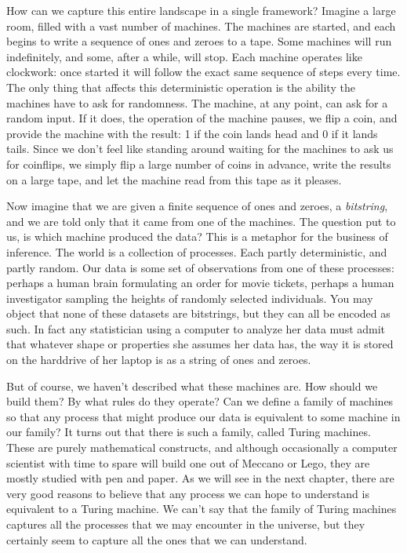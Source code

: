 How can we capture this entire landscape in a single framework? Imagine a large room, filled with a vast number of machines. The machines are started, and each begins to write a sequence of ones and zeroes to a tape. Some machines will run indefinitely, and some, after a while, will stop. Each machine operates like clockwork: once started it will follow the exact same sequence of steps every time. The only thing that affects this deterministic operation is the ability the machines have to ask for randomness. The machine, at any point, can ask for a random input. If it does, the operation of the machine pauses, we flip a coin, and provide the machine with the result: 1 if the coin lands head and 0 if it lands tails. Since we don't feel like standing around waiting for the machines to ask us for coinflips, we simply flip a large number of coins in advance, write the results on a large tape, and let the machine read from this tape as it pleases.

Now imagine that we are given a finite sequence of ones and zeroes, a \emph{bitstring}, and we are told only that it came from one of the machines. The question put to us, is which machine produced the data? This is a metaphor for the business of inference. The world is a collection of processes. Each partly deterministic, and partly random. Our data is some set of observations from one of these processes: perhaps a human brain formulating an order for movie tickets, perhaps a human investigator sampling the heights of randomly selected individuals. You may object that none of these datasets are bitstrings, but they can all be encoded as such. In fact any statistician using a computer to analyze her data must admit that whatever shape or properties she assumes her data has, the way it is stored on the harddrive of her laptop is as a string of ones and zeroes.

But of course, we haven't described what these machines are. How should we build them? By what rules do they operate? Can we define a family of machines so that any process that might produce our data is equivalent to some machine in our family? It turns out that there is such a family, called Turing machines. These are purely mathematical constructs, and although occasionally a computer scientist with time to spare will build one out of Meccano or Lego, they are mostly studied with pen and paper. As we will see in the next chapter, there are very good reasons to believe that any process we can hope to understand is equivalent to a Turing machine. We can't say that the family of Turing machines captures all the processes that we may encounter in the universe, but they certainly seem to capture all the ones that we can understand.

